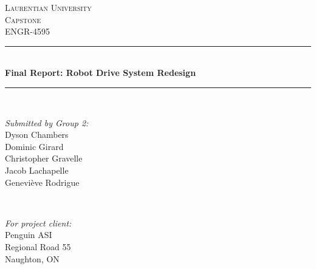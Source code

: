 \begin{titlepage}

\newcommand{\HRule}{\rule{\linewidth}{0.5mm}} %

\center %
 

\textsc{\LARGE Laurentian University}\\[1.5cm] %
\textsc{\Large Capstone}\\[0.5cm] %
\textsc{\large ENGR-4595}\\[0.5cm] %


\HRule \\[0.4cm]
{ \huge \bfseries Final Report: Robot Drive System Redesign}\\[0.4cm] %
\HRule \\[1.5cm]
 

\begin{minipage}{0.4\textwidth}
\begin{flushleft} \large
\emph{Submitted by Group 2:}\\
Dyson Chambers \textsc{} \\
Dominic Girard \textsc{} \\
Christopher Gravelle \textsc{} \\
Jacob Lachapelle \textsc{} \\
Genevi\`{e}ve Rodrigue \textsc{}
\end{flushleft}
\end{minipage}
~
\begin{minipage}{0.4\textwidth}
\begin{flushright} \large
\emph{For project client:} \\
Penguin ASI\\
Regional Road 55\\
Naughton, ON %
\end{flushright}
\end{minipage}\\[4cm]



\end{titlepage}
